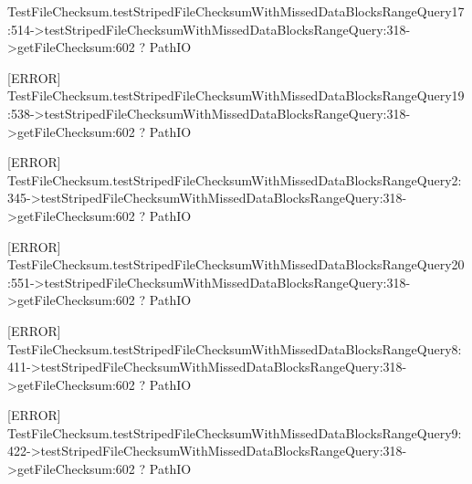 \documentclass{report}%
\begin{document}
\begin{enumerate}
\begin{spverbatim}
[ERROR]   TestFileChecksum.testStripedFileChecksumWithMissedDataBlocksRangeQuery17:514->testStripedFileChecksumWithMissedDataBlocksRangeQuery:318->getFileChecksum:602 ? PathIO

[ERROR]   TestFileChecksum.testStripedFileChecksumWithMissedDataBlocksRangeQuery19:538->testStripedFileChecksumWithMissedDataBlocksRangeQuery:318->getFileChecksum:602 ? PathIO

[ERROR]   TestFileChecksum.testStripedFileChecksumWithMissedDataBlocksRangeQuery2:345->testStripedFileChecksumWithMissedDataBlocksRangeQuery:318->getFileChecksum:602 ? PathIO

[ERROR]   TestFileChecksum.testStripedFileChecksumWithMissedDataBlocksRangeQuery20:551->testStripedFileChecksumWithMissedDataBlocksRangeQuery:318->getFileChecksum:602 ? PathIO

[ERROR]   TestFileChecksum.testStripedFileChecksumWithMissedDataBlocksRangeQuery8:411->testStripedFileChecksumWithMissedDataBlocksRangeQuery:318->getFileChecksum:602 ? PathIO

[ERROR]   TestFileChecksum.testStripedFileChecksumWithMissedDataBlocksRangeQuery9:422->testStripedFileChecksumWithMissedDataBlocksRangeQuery:318->getFileChecksum:602 ? PathIO


\end{spverbatim}
\end{enumerate}
\end{document}
